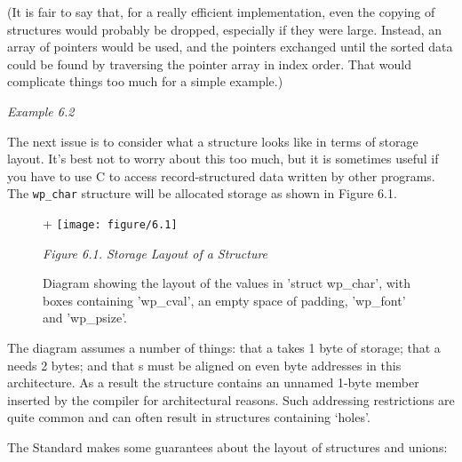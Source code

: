    (It is fair to say that, for a really efficient implementation, even the
    copying of structures would probably be dropped, especially if they were
    large. Instead, an array of pointers would be used, and the pointers
    exchanged until the sorted data could be found by traversing the pointer
    array in index order. That would complicate things too much for a simple
    example.)


   \begin{center}\textit{Example 6.2}\end{center}


   The next issue is to consider what a structure looks like in terms of
    storage layout. It's best not to worry about this too much, but it is
    sometimes useful if you have to use C to access record-structured data
    written by other programs. The \texttt{wp\_char} structure will be
    allocated storage as shown in Figure 6.1.


    \begin{figure*}[htb]+\centering
      \texttt{[image: figure/6.1]}
      \caption{Diagram showing the layout of the values in 'struct wp\_char',
        with boxes containing 'wp\_cval',
        an empty space of padding, 'wp\_font' and 'wp\_psize'.}
\begin{center}\textit{Figure 6.1. Storage Layout of a Structure}\end{center}
    \end{figure*}



   The diagram assumes a number of things: that a \kchar{} takes
    1 byte of storage; that a \short{} needs 2 bytes; and that
    \short{}s must be aligned on even byte addresses in this
    architecture. As a result the structure contains an unnamed 1-byte member
    inserted by the compiler for architectural reasons. Such addressing
    restrictions are quite common and can often result in structures containing
    `holes'.


   The Standard makes some guarantees about the layout of structures and
    unions:


